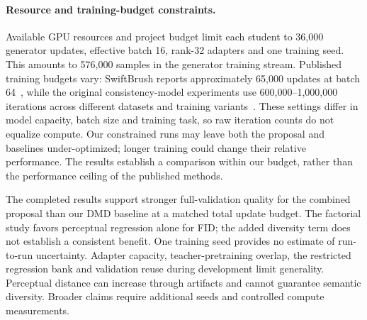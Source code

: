 \documentclass[10pt,twocolumn,letterpaper]{article}
\begin{document}
\paragraph{Resource and training-budget constraints.}
Available GPU resources and project budget limit each student to 36,000
generator updates, effective batch 16, rank-32 adapters and one training seed.
This amounts to 576,000 samples in the generator training stream. Published
training budgets vary: SwiftBrush reports approximately 65,000 updates at
batch 64~\cite{nguyen2024swiftbrush}, while the original consistency-model
experiments use 600,000--1,000,000 iterations across different datasets and
training variants~\cite{song2023consistency}. These settings differ in model
capacity, batch size and training task, so raw iteration counts do not equalize
compute. Our constrained runs may leave both the proposal and baselines
under-optimized; longer training could change their relative performance.
The results establish a comparison within our budget, rather than the
performance ceiling of the published methods.

The completed results support stronger full-validation quality for the
combined proposal than our DMD baseline at a matched total update
budget. The factorial study favors perceptual regression alone for FID;
the added diversity term does not establish a consistent benefit.
One training seed provides no estimate
of run-to-run uncertainty. Adapter capacity, teacher-pretraining overlap,
the restricted regression bank and validation reuse during development limit
generality. Perceptual distance can increase through artifacts and cannot
guarantee semantic diversity. Broader claims require additional seeds and controlled
compute measurements.

{\small


}
\end{document}
